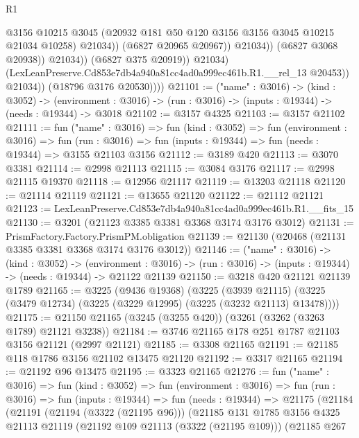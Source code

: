 \begin{lexlean}{R1}
\begin{coremodule}
                                    @3156
                                    @10215
                                    @3045
                                    (@20932 @181 @50 @120 @3156 @3156 @3045 @10215 @21034 @10258)
                                    @21034))
                                (@6827 @20965 @20967))
                              @21034))
                          (@6827 @3068 @20938))
                        @21034))
                    (@6827 @375 @20919))
                  @21034)
                (LexLeanPreserve.Cd853e7db4a940a81cc4ad0a999ec461b.R1.__rel_13 @20453))
              @21034))
          (@18796 @3176 @20530))))
@21101 := ("name" : @3016) ->
  (kind : @3052) ->
  (environment : @3016) -> (run : @3016) -> (inputs : @19344) -> (needs : @19344) -> @3018
@21102 := @3157 @4325
@21103 := @3157 @21102
@21111 := fun ("name" : @3016) =>
  fun (kind : @3052) =>
  fun (environment : @3016) =>
  fun (run : @3016) => fun (inputs : @19344) => fun (needs : @19344) => @3155 @21103 @3156
@21112 := @3189 @420
@21113 := @3070 @3381
@21114 := @2998 @21113
@21115 := @3084 @3176
@21117 := @2998 @21115 @19370
@21118 := @12956 @21117
@21119 := @13203 @21118
@21120 := @21114 @21119
@21121 := @13655 @21120
@21122 := @21112 @21121
@21123 := LexLeanPreserve.Cd853e7db4a940a81cc4ad0a999ec461b.R1.__fits_15
@21130 := @3201 (@21123 @3385 @3381 @3368 @3174 @3176 @3012)
@21131 := PrismFactory.Factory.PrismPM.obligation
@21139 := @21130 (@20468 (@21131 @3385 @3381 @3368 @3174 @3176 @3012))
@21146 := ("name" : @3016) ->
  (kind : @3052) ->
  (environment : @3016) -> (run : @3016) -> (inputs : @19344) -> (needs : @19344) -> @21122 @21139
@21150 := @3218 @420 @21121 @21139 @1789
@21165 := @3225
    (@9436 @19368)
    (@3225
      (@3939 @21115)
      (@3225 (@3479 @12734) (@3225 (@3229 @12995) (@3225 (@3232 @21113) @13478))))
@21175 := @21150 @21165 (@3245 (@3255 @420)) (@3261 (@3262 (@3263 @1789) @21121 @3238))
@21184 := @3746 @21165 @178 @251 @1787 @21103 @3156 @21121 (@2997 @21121)
@21185 := @3308 @21165
@21191 := @21185 @118 @1786 @3156 @21102 @13475 @21120
@21192 := @3317 @21165
@21194 := @21192 @96 @13475
@21195 := @3323 @21165
@21276 := fun ("name" : @3016) =>
  fun (kind : @3052) =>
  fun (environment : @3016) =>
  fun (run : @3016) =>
  fun (inputs : @19344) =>
  fun (needs : @19344) =>
  @21175
    (@21184
      (@21191
        (@21194 (@3322 (@21195 @96)))
        (@21185
          @131
          @1785
          @3156
          @4325
          @21113
          @21119
          (@21192 @109 @21113 (@3322 (@21195 @109)))
          (@21185
            @267

\end{coremodule}
\end{lexlean}
